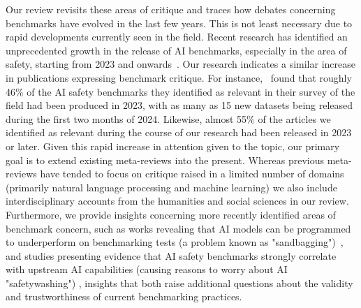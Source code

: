 Our review revisits these areas of critique and traces how debates concerning benchmarks have evolved in the last few years. This is not least necessary due to rapid developments currently seen in the field. Recent research has identified an unprecedented growth in the release of AI benchmarks, especially in the area of safety, starting from 2023 and onwards~\cite{rottger2024}. Our research indicates a similar increase in publications expressing benchmark critique. For instance,~\citet{rottger2024} found that roughly 46\% of the AI safety benchmarks they identified as relevant in their survey of the field had been produced in 2023, with as many as 15 new datasets being released during the first two months of 2024. Likewise, almost 55\% of the articles we identified as relevant during the course of our research had been released in 2023 or later.  Given this rapid increase in attention given to the topic, our primary goal is to extend existing meta-reviews into the present. Whereas previous meta-reviews have tended to focus on critique raised in a limited number of domains (primarily natural language processing and machine learning) we also include interdisciplinary accounts from the humanities and social sciences in our review. Furthermore, we provide insights concerning more recently identified areas of benchmark concern, such as works revealing that AI models can be programmed to underperform on benchmarking tests (a problem known as "sandbagging")~\cite{weij2024}, and studies presenting evidence that AI safety benchmarks strongly correlate with upstream AI capabilities (causing reasons to worry about AI "safetywashing") \cite{ren2024}, insights that both raise additional questions about the validity and trustworthiness of current benchmarking practices. 



